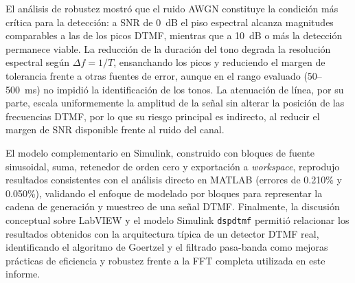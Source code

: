 \documentclass[conference]{IEEEtran}
\begin{document}
El análisis de robustez mostró que el ruido AWGN constituye la condición más crítica para la detección: a SNR de 0~dB el piso espectral alcanza magnitudes comparables a las de los picos DTMF, mientras que a 10~dB o más la detección permanece viable. La reducción de la duración del tono degrada la resolución espectral según $\Delta f = 1/T$, ensanchando los picos y reduciendo el margen de tolerancia frente a otras fuentes de error, aunque en el rango evaluado (50--500~ms) no impidió la identificación de los tonos. La atenuación de línea, por su parte, escala uniformemente la amplitud de la señal sin alterar la posición de las frecuencias DTMF, por lo que su riesgo principal es indirecto, al reducir el margen de SNR disponible frente al ruido del canal.

El modelo complementario en Simulink, construido con bloques de fuente sinusoidal, suma, retenedor de orden cero y exportación a \textit{workspace}, reprodujo resultados consistentes con el análisis directo en MATLAB (errores de 0.210\% y 0.050\%), validando el enfoque de modelado por bloques para representar la cadena de generación y muestreo de una señal DTMF. Finalmente, la discusión conceptual sobre LabVIEW y el modelo Simulink \texttt{dspdtmf} permitió relacionar los resultados obtenidos con la arquitectura típica de un detector DTMF real, identificando el algoritmo de Goertzel y el filtrado pasa-banda como mejoras prácticas de eficiencia y robustez frente a la FFT completa utilizada en este informe.



\end{document}
